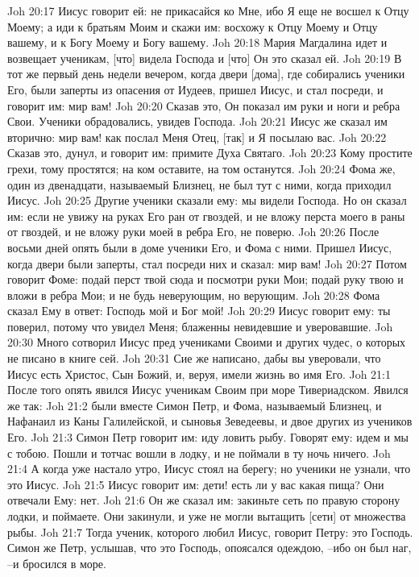 Joh 20:17  Иисус говорит ей: не прикасайся ко Мне, ибо Я еще не восшел к Отцу Моему; а иди к братьям Моим и скажи им: восхожу к Отцу Моему и Отцу вашему, и к Богу Моему и Богу вашему.
Joh 20:18  Мария Магдалина идет и возвещает ученикам, [что] видела Господа и [что] Он это сказал ей.
Joh 20:19  В тот же первый день недели вечером, когда двери [дома], где собирались ученики Его, были заперты из опасения от Иудеев, пришел Иисус, и стал посреди, и говорит им: мир вам!
Joh 20:20  Сказав это, Он показал им руки и ноги и ребра Свои. Ученики обрадовались, увидев Господа.
Joh 20:21  Иисус же сказал им вторично: мир вам! как послал Меня Отец, [так] и Я посылаю вас.
Joh 20:22  Сказав это, дунул, и говорит им: примите Духа Святаго.
Joh 20:23  Кому простите грехи, тому простятся; на ком оставите, на том останутся.
Joh 20:24  Фома же, один из двенадцати, называемый Близнец, не был тут с ними, когда приходил Иисус.
Joh 20:25  Другие ученики сказали ему: мы видели Господа. Но он сказал им: если не увижу на руках Его ран от гвоздей, и не вложу перста моего в раны от гвоздей, и не вложу руки моей в ребра Его, не поверю.
Joh 20:26  После восьми дней опять были в доме ученики Его, и Фома с ними. Пришел Иисус, когда двери были заперты, стал посреди них и сказал: мир вам!
Joh 20:27  Потом говорит Фоме: подай перст твой сюда и посмотри руки Мои; подай руку твою и вложи в ребра Мои; и не будь неверующим, но верующим.
Joh 20:28  Фома сказал Ему в ответ: Господь мой и Бог мой!
Joh 20:29  Иисус говорит ему: ты поверил, потому что увидел Меня; блаженны невидевшие и уверовавшие.
Joh 20:30  Много сотворил Иисус пред учениками Своими и других чудес, о которых не писано в книге сей.
Joh 20:31  Сие же написано, дабы вы уверовали, что Иисус есть Христос, Сын Божий, и, веруя, имели жизнь во имя Его.
Joh 21:1  После того опять явился Иисус ученикам Своим при море Тивериадском. Явился же так:
Joh 21:2  были вместе Симон Петр, и Фома, называемый Близнец, и Нафанаил из Каны Галилейской, и сыновья Зеведеевы, и двое других из учеников Его.
Joh 21:3  Симон Петр говорит им: иду ловить рыбу. Говорят ему: идем и мы с тобою. Пошли и тотчас вошли в лодку, и не поймали в ту ночь ничего.
Joh 21:4  А когда уже настало утро, Иисус стоял на берегу; но ученики не узнали, что это Иисус.
Joh 21:5  Иисус говорит им: дети! есть ли у вас какая пища? Они отвечали Ему: нет.
Joh 21:6  Он же сказал им: закиньте сеть по правую сторону лодки, и поймаете. Они закинули, и уже не могли вытащить [сети] от множества рыбы.
Joh 21:7  Тогда ученик, которого любил Иисус, говорит Петру: это Господь. Симон же Петр, услышав, что это Господь, опоясался одеждою, --ибо он был наг, --и бросился в море.
